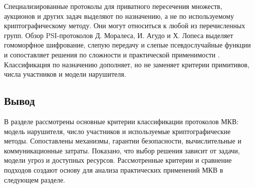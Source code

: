 Специализированные протоколы для приватного пересечения множеств, аукционов и других задач выделяют по назначению, а не по используемому криптографическому методу. Они могут относиться к любой из перечисленных групп. Обзор PSI-протоколов Д. Моралеса, И. Агудо и Х. Лопеса выделяет гомоморфное шифрование, слепую передачу и слепые псевдослучайные функции и сопоставляет решения по сложности и практической применимости \cite{09}. Классификация по назначению дополняет, но не заменяет критерии примитивов, числа участников и модели нарушителя.

\subsection{Вывод}

В разделе рассмотрены основные критерии классификации протоколов МКВ: модель нарушителя, число участников и используемые криптографические методы. Сопоставлены механизмы, гарантии безопасности, вычислительные и коммуникационные затраты. Показано, что выбор решения зависит от задачи, модели угроз и доступных ресурсов. Рассмотренные критерии и сравнение подходов создают основу для анализа практических применений МКВ в следующем разделе.